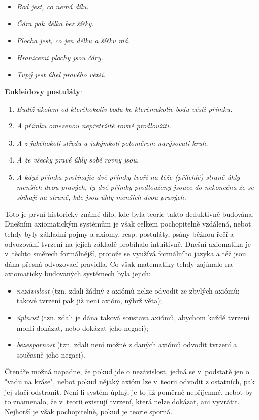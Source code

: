 \begin{itemize}
\item \textit{Bod jest, co nemá dílu.}
\item \textit{Čára pak délka bez šířky.}
\item \textit{Plocha jest, co jen délku a šířku má.}
\item \textit{Hranicemi plochy jsou čáry.}
\item \textit{Tupý jest úhel pravého větší.}
\end{itemize}
\noindent \textbf{Eukleidovy postuláty}:
\begin{enumerate}[label=({E}\arabic*)]
\item \textit{Budiž úkolem od kteréhokoliv bodu ke kterémukoliv bodu vésti přímku.}
\item \textit{A přímku omezenou nepřetržitě rovně prodloužiti.}
\item \textit{A z jakéhokoli středu a jakýmkoli poloměrem narýsovati kruh.}
\item \textit{A že všecky pravé úhly sobě rovny jsou.}
\item \textit{A když přímka protínajíc dvě přímky tvoří na téže (přilehlé) straně úhly menších dvou pravých, ty dvě přímky prodlouženy jsouce do nekonečna že se sbíhají na straně, kde jsou úhly menších dvou pravých.}
\end{enumerate}
Toto je první historicky známé dílo, kde byla teorie takto deduktivně budována. Dnešním axiomatickým systémům je však celkem pochopitelně vzdálená, neboť tehdy byly základní pojmy a axiomy, resp. postuláty, psány běžnou řečí a odvozování tvrzení na jejich základě probíhalo intuitivně. Dnešní axiomatika je v~těchto směrech formálnější, protože se využívá formálního jazyka a též jsou dána přesná odvozovací pravidla. Co však matematiky tehdy zajímalo na axiomaticky budovaných systémech byla jejich:
\begin{itemize}
\item \emph{nezávislost} (tzn. zdali žádný z axiómů nelze odvodit ze zbylých axiómů; takové tvrzení pak již není axióm, nýbrž věta);
\item \emph{úplnost} (tzn. zdali je dána taková soustava axiómů, abychom každé tvrzení mohli dokázat, nebo dokázat jeho negaci);
\item \emph{bezespornost} (tzn. zdali není možné z daných axiómů odvodit tvrzení a současně jeho negaci).
\end{itemize}
Čtenáře možná napadne, že pokud jde o nezávislost, jedná se v~podstatě jen o "vadu na kráse", neboť pokud nějaký axióm lze v~teorii odvodit z ostatních, pak jej stačí odstranit. Není-li systém úplný, je to již poměrně nepříjemné, neboť by to znamenalo, že v~teorii existují tvrzení, která nelze dokázat, ani vyvrátit. Nejhorší je však pochopitelně, pokud je teorie sporná.

